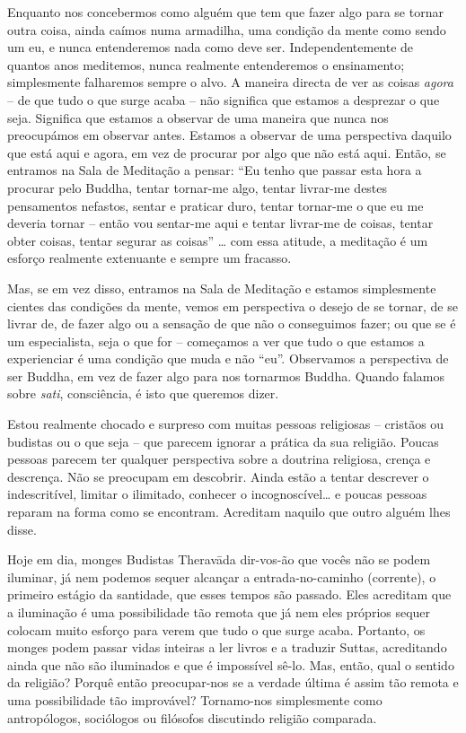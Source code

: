 Enquanto nos concebermos como alguém que tem que fazer algo para se tornar outra
coisa, ainda caímos numa armadilha, uma condição da mente como sendo um eu, e
nunca entenderemos nada como deve ser. Independentemente de quantos anos
meditemos, nunca realmente entenderemos o ensinamento; simplesmente falharemos
sempre o alvo. A maneira directa de ver as coisas \emph{agora} -- de que tudo o
que surge acaba -- não significa que estamos a desprezar o que seja. Significa
que estamos a observar de uma maneira que nunca nos preocupámos em observar
antes. Estamos a observar de uma perspectiva daquilo que está aqui e agora, em
vez de procurar por algo que não está aqui. Então, se entramos na Sala de
Meditação a pensar: ``Eu tenho que passar esta hora a procurar pelo Buddha,
tentar tornar-me algo, tentar livrar-me destes pensamentos nefastos, sentar e
praticar duro, tentar tornar-me o que eu me deveria tornar -- então vou
sentar-me aqui e tentar livrar-me de coisas, tentar obter coisas, tentar segurar
as coisas'' \ldots{} com essa atitude, a meditação é um esforço realmente
extenuante e sempre um fracasso.

Mas, se em vez disso, entramos na Sala de Meditação e estamos simplesmente
cientes das condições da mente, vemos em perspectiva o desejo de se tornar, de
se livrar de, de fazer algo ou a sensação de que não o conseguimos fazer; ou que
se é um especialista, seja o que for -- começamos a ver que tudo o que estamos a
experienciar é uma condição que muda e não ``eu''. Observamos a perspectiva de
ser Buddha, em vez de fazer algo para nos tornarmos Buddha. Quando falamos sobre
\emph{sati}, consciência, é isto que queremos dizer.

Estou realmente chocado e surpreso com muitas pessoas religiosas -- cristãos ou
budistas ou o que seja -- que parecem ignorar a prática da sua religião. Poucas
pessoas parecem ter qualquer perspectiva sobre a doutrina religiosa, crença e
descrença. Não se preocupam em descobrir. Ainda estão a tentar descrever o
indescritível, limitar o ilimitado, conhecer o incognoscível\ldots{} e poucas
pessoas reparam na forma como se encontram. Acreditam naquilo que outro alguém
lhes disse.

Hoje em dia, monges Budistas Theravāda dir-vos-ão que vocês não se podem
iluminar, já nem podemos sequer alcançar a entrada-no-caminho (corrente), o
primeiro estágio da santidade, que esses tempos são passado. Eles acreditam que
a iluminação é uma possibilidade tão remota que já nem eles próprios sequer
colocam muito esforço para verem que tudo o que surge acaba. Portanto, os monges
podem passar vidas inteiras a ler livros e a traduzir Suttas, acreditando ainda
que não são iluminados e que é impossível sê-lo. Mas, então, qual o sentido da
religião? Porquê então preocupar-nos se a verdade última é assim tão remota e
uma possibilidade tão improvável? Tornamo-nos simplesmente como antropólogos,
sociólogos ou filósofos discutindo religião comparada.

